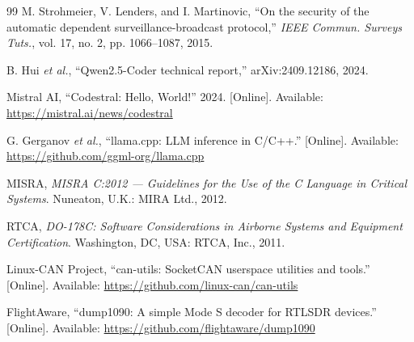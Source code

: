 \documentclass[12pt]{IEEEtran}
\begin{document}
\begin{thebibliography}{99}
M. Strohmeier, V. Lenders, and I. Martinovic, ``On the security of the automatic dependent surveillance-broadcast protocol,'' \emph{IEEE Commun. Surveys Tuts.}, vol. 17, no. 2, pp. 1066--1087, 2015.

B. Hui \emph{et al.}, ``Qwen2.5-Coder technical report,'' arXiv:2409.12186, 2024.

Mistral AI, ``Codestral: Hello, World!'' 2024. [Online]. Available: \url{https://mistral.ai/news/codestral}

G. Gerganov \emph{et al.}, ``llama.cpp: LLM inference in C/C++.'' [Online]. Available: \url{https://github.com/ggml-org/llama.cpp}

MISRA, \emph{MISRA C:2012 --- Guidelines for the Use of the C Language in Critical Systems}. Nuneaton, U.K.: MIRA Ltd., 2012.

RTCA, \emph{DO-178C: Software Considerations in Airborne Systems and Equipment Certification}. Washington, DC, USA: RTCA, Inc., 2011.

Linux-CAN Project, ``can-utils: SocketCAN userspace utilities and tools.'' [Online]. Available: \url{https://github.com/linux-can/can-utils}

FlightAware, ``dump1090: A simple Mode S decoder for RTLSDR devices.'' [Online]. Available: \url{https://github.com/flightaware/dump1090}

\end{thebibliography}
\end{document}
